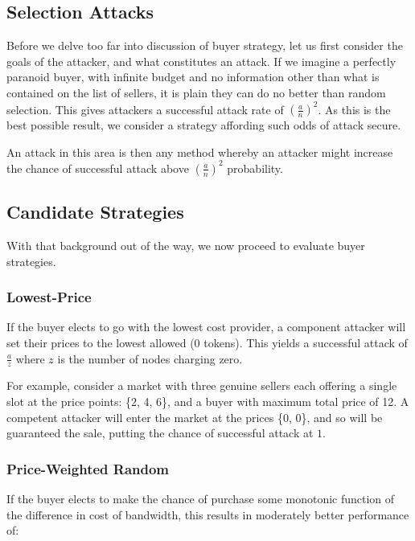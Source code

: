 \subsection{Selection Attacks}

Before we delve too far into discussion of buyer strategy, let us
first consider the goals of the attacker, and what constitutes an
attack. If we imagine a perfectly paranoid buyer, with infinite budget
and no information other than what is contained on the list of
sellers, it is plain they can do no better than random selection. This
gives attackers a successful attack rate of $(\frac{a}{n})^2$. As this
is the best possible result, we consider a strategy affording such
odds of attack secure.

An attack in this area is then any method whereby an attacker might
increase the chance of successful attack above $(\frac{a}{n})^2$
probability.

\subsection{Candidate Strategies}

With that background out of the way, we now proceed to evaluate buyer strategies.

\subsubsection*{Lowest-Price}

If the buyer elects to go with the lowest cost provider, a component
attacker will set their prices to the lowest allowed (0 tokens). This
yields a successful attack of $\frac{a}{z}$ where $z$ is the number of
nodes charging zero.

For example, consider a market with three genuine sellers each
offering a single slot at the price points: \{2, 4, 6\}, and a buyer
with maximum total price of 12. A competent attacker will enter the
market at the prices \{0, 0\}, and so will be guaranteed the sale,
putting the chance of successful attack at $1$.

\subsubsection*{Price-Weighted Random}

If the buyer elects to make the chance of purchase some monotonic
function of the difference in cost of bandwidth, this results in
moderately better performance of:

